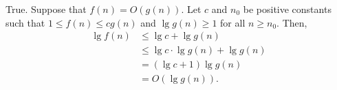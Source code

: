 True.
Suppose that $f(n)=O(g(n))$.
Let $c$ and $n_0$ be positive constants such that $1\le f(n)\le cg(n)$ and $\lg g(n)\ge1$ for all $n\ge n_0$.
Then,
\begin{align*}
    \lg f(n) &\le \lg c+\lg g(n) \\
    &\le \lg c\cdot\lg g(n)+\lg g(n) \\
    &= (\lg c+1)\lg g(n) \\
    &= O(\lg g(n)).
\end{align*}
